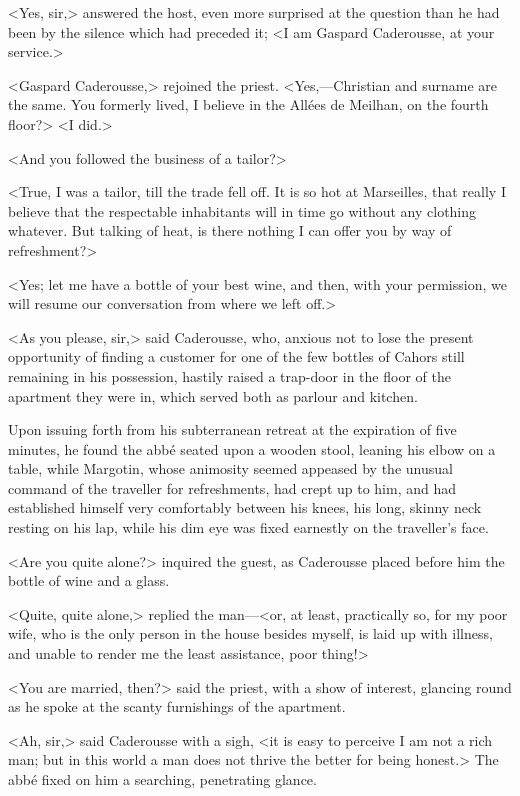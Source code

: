  <Yes, sir,> answered the host, even more surprised at the question than he had been by the silence which had preceded it; <I am Gaspard Caderousse, at your service.> 

 <Gaspard Caderousse,> rejoined the priest. <Yes,—Christian and surname are the same. You formerly lived, I believe in the Allées de Meilhan, on the fourth floor?>  <I did.> 

 <And you followed the business of a tailor?> 

 <True, I was a tailor, till the trade fell off. It is so hot at Marseilles, that really I believe that the respectable inhabitants will in time go without any clothing whatever. But talking of heat, is there nothing I can offer you by way of refreshment?> 

 <Yes; let me have a bottle of your best wine, and then, with your permission, we will resume our conversation from where we left off.> 

 <As you please, sir,> said Caderousse, who, anxious not to lose the present opportunity of finding a customer for one of the few bottles of Cahors still remaining in his possession, hastily raised a trap-door in the floor of the apartment they were in, which served both as parlour and kitchen. 

 Upon issuing forth from his subterranean retreat at the expiration of five minutes, he found the abbé seated upon a wooden stool, leaning his elbow on a table, while Margotin, whose animosity seemed appeased by the unusual command of the traveller for refreshments, had crept up to him, and had established himself very comfortably between his knees, his long, skinny neck resting on his lap, while his dim eye was fixed earnestly on the traveller's face. 

 <Are you quite alone?> inquired the guest, as Caderousse placed before him the bottle of wine and a glass. 

 <Quite, quite alone,> replied the man—<or, at least, practically so, for my poor wife, who is the only person in the house besides myself, is laid up with illness, and unable to render me the least assistance, poor thing!> 

 <You are married, then?> said the priest, with a show of interest, glancing round as he spoke at the scanty furnishings of the apartment. 

 <Ah, sir,> said Caderousse with a sigh, <it is easy to perceive I am not a rich man; but in this world a man does not thrive the better for being honest.> The abbé fixed on him a searching, penetrating glance. 

